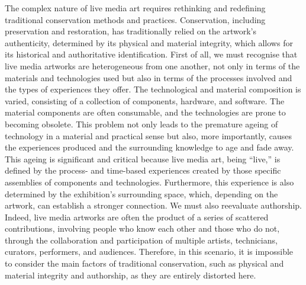 The complex nature of live media art requires rethinking and redefining traditional conservation methods and practices. Conservation, including preservation and restoration, has traditionally relied on the artwork’s authenticity, determined by its physical and material integrity, which allows for its historical and authoritative identification. First of all, we must recognise that live media artworks are heterogeneous from one another, not only in terms of the materials and technologies used but also in terms of the processes involved and the types of experiences they offer. The technological and material composition is varied, consisting of a collection of components, hardware, and software. The material components are often consumable, and the technologies are prone to becoming obsolete. This problem not only leads to the premature ageing of technology in a material and practical sense but also, more importantly, causes the experiences produced and the surrounding knowledge to age and fade away. This ageing is significant and critical because live media art, being ``live,'' is defined by the process- and time-based experiences created by those specific assemblies of components and technologies. Furthermore, this experience is also determined by the exhibition's surrounding space, which, depending on the artwork, can establish a stronger connection. We must also reevaluate authorship. Indeed, live media artworks are often the product of a series of scattered contributions, involving people who know each other and those who do not, through the collaboration and participation of multiple artists, technicians, curators, performers, and audiences. Therefore, in this scenario, it is impossible to consider the main factors of traditional conservation, such as physical and material integrity and authorship, as they are entirely distorted here.\\ 
